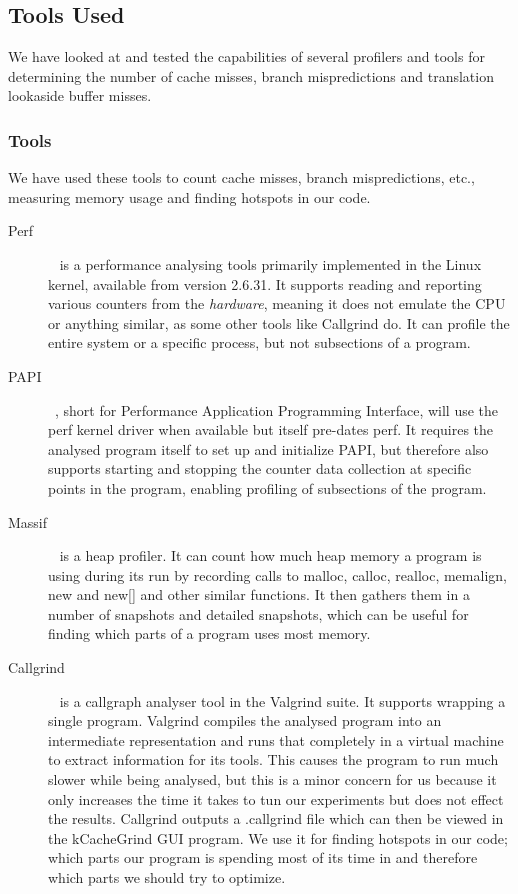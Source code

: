 \subsection{Tools Used}
We have looked at and tested the capabilities of several profilers and tools for determining the number of cache misses, branch mispredictions and translation lookaside buffer misses.


\subsubsection{Tools}
We have used these tools to count cache misses, branch mispredictions, etc., measuring memory usage and finding hotspots in our code.
\begin{description}
\item[Perf]~ is a performance analysing tools primarily implemented in the Linux kernel, available from version 2.6.31.
It supports reading and reporting various counters from the \textit{hardware}, meaning it does not emulate the CPU or anything similar, as some other tools like Callgrind do.
It can profile the entire system or a specific process, but not subsections of a program.
\item[PAPI]~, short for Performance Application Programming Interface, will use the perf kernel driver when available but itself pre-dates perf.
It requires the analysed program itself to set up and initialize PAPI, but therefore also supports starting and stopping the counter data collection at specific points in the program, enabling profiling of subsections of the program.
\item[Massif]~ is a heap profiler. It can count how much heap memory a program is using during its run by recording calls to malloc, calloc, realloc, memalign, new and new[] and other similar functions.
It then gathers them in a number of snapshots and detailed snapshots, which can be useful for finding which parts of a program uses most memory.
\item[Callgrind]~ is a callgraph analyser tool in the Valgrind suite.
It supports wrapping a single program.
Valgrind compiles the analysed program into an intermediate representation and runs that completely in a virtual machine to extract information for its tools.
This causes the program to run much slower while being analysed, but this is a minor concern for us because it only increases the time it takes to tun our experiments but does not effect the results.
Callgrind outputs a .callgrind file which can then be viewed in the kCacheGrind GUI program.
We use it for finding hotspots in our code; which parts our program is spending most of its time in and therefore which parts we should try to optimize.
\end{description}
